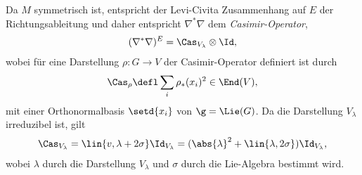 \documentclass[%
	paper=a5,%
	fleqn,%
	DIV=18,%
	BCOR=0mm,
	fontsize=11pt,
	titlepage=false,%
	bibliography=totoc,
	DIV=18,%
	twoside=true,
	pdftitle=Riemannsche Geometrie,
	pdfauthor=Uwe Semmelmann,
	numbers=noendperiod]%
	{scrbook}
\begin{document}
Da $M$ symmetrisch ist, entspricht der Levi-Civita Zusammenhang auf $E$ der Richtungsableitung und daher entspricht $\nabla^*\nabla$ dem \textit{Casimir-Operator},
\begin{align*}
(\nabla^*\nabla)^E = \Cas_{V_{\lambda}}\otimes \Id,
\end{align*}
wobei für eine Darstellung $\rho: G\to V$ der Casimir-Operator definiert ist durch
\begin{align*}
\Cas_{\rho} \defl \sum_{i} \rho_{*}(x_{i})^2 \in \End(V),
\end{align*}
mit einer Orthonormalbasis $\setd{x_{i}}$  von $\g = \Lie(G)$. Da die Darstellung $V_{\lambda}$ irreduzibel ist, gilt
\begin{align*}
\Cas_{V_{\lambda}} = \lin{v,\lambda + 2\sigma}\Id_{V_{\lambda}}  =(\abs{\lambda}^2 + \lin{\lambda,2\sigma})\Id_{V_{\lambda}},
\end{align*}
wobei $\lambda$ durch die Darstellung $V_{\lambda}$ und $\sigma$ durch die Lie-Algebra bestimmt wird.
\end{document}
